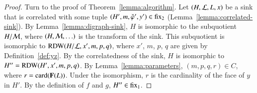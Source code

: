 \begin{proof} Turn to the proof of Theorem~\ref{lemma:algorithm}.  Let
  $(H,{\cal L},L,x)$ be a sink that is correlated with some tuple
  $(H',m,\check\varphi',y')\in {\operatorname{fix}}_2$
  (Lemma~\ref{lemma:correlated-sink}).  By
  Lemma~\ref{lemma:digraph-sink}, $H$ is isomorphic to the subquotient
  $H/{\cal M}$, where $(H,{\cal M},\ldots)$ is the transform of the
  sink.  This subquotient is isomorphic to ${\operatorname{RDW}}(H/{\cal
    L},x',m,p,q)$, where $x'$, $m$, $p$, $q$ are given by
  Definition~\ref{def:yz}.  By the correlatedness of the sink, $H$ is
  isomorphic to $H''={\operatorname{RDW}}(H',x',m,p,q)$.  By
  Lemma~\ref{lemma:parameters}, $(m,p,q,r)\in C$, where
  $r={\operatorname{card}}({\mathbf F}(L))$.  Under the isomorphism, $r$ is the cardinality
  of the face of $y$ in $H'$.  By the definition of $f$ and $g$,
  $H''\in {\operatorname{fix}}_1$.
\end{proof}



